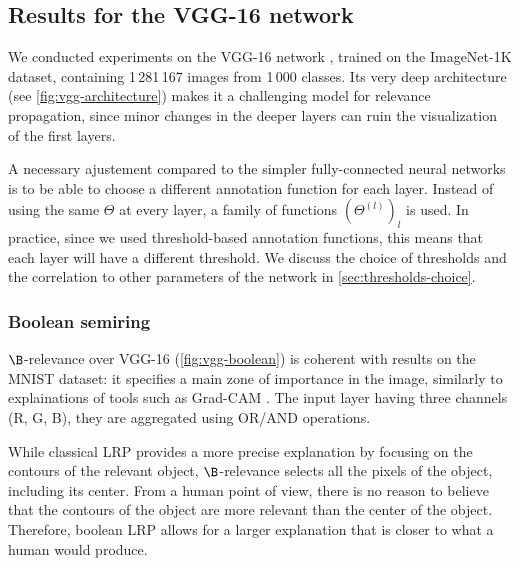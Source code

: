 \documentclass[twocolumn]{../cs-classes/cs-classes}
\newcommand*{\1}{\digitsbb{1}}
\newcommand*{\0}{\digitsbb{0}}
\begin{document}
\subsection{Results for the VGG-16 network}
We conducted experiments on the VGG-16 network \cite{vgg}, trained on the ImageNet-1K dataset, containing 1\,281\,167 images from 1\,000 classes. Its very deep architecture (see \autoref{fig:vgg-architecture}) makes it a challenging model for relevance propagation, since minor changes in the deeper layers can ruin the visualization of the first layers.

A necessary ajustement compared to the simpler fully-connected neural networks is to be able to choose a different annotation function for each layer. Instead of using the same $\Theta$ at every layer, a family of functions $(\Theta^{(l)})_l$ is used. In practice, since we used threshold-based annotation functions, this means that each layer will have a different threshold. We discuss the choice of thresholds and the correlation to other parameters of the network in \autoref{sec:thresholds-choice}.

\subsubsection{Boolean semiring}
$\B$-relevance over VGG-16 (\autoref{fig:vgg-boolean}) is coherent with results on the MNIST dataset: it specifies a main zone of importance in the image, similarly to explainations of tools such as Grad-CAM \cite{gradcam}. The input layer having three channels (R, G, B), they are aggregated using OR/AND operations.

While classical LRP provides a more precise explanation by focusing on the contours of the relevant object, $\B$-relevance selects all the pixels of the object, including its center. From a human point of view, there is no reason to believe that the contours of the object are more relevant than the center of the object. Therefore, boolean LRP allows for a larger explanation that is closer to what a human would produce.
\end{document}
